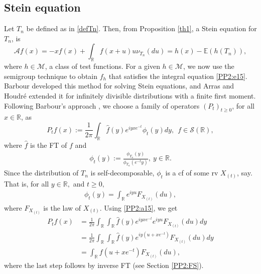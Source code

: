 \documentclass[12pt, a4paper,reqno]{amsart}
\theoremstyle{definition}
\theoremstyle{myremark}
\numberwithin{equation}{section}
\begin{document}
\subsection{Stein equation}\label{SEBGD}
Let $T_n$ be defined as in \eqref{defTn}. Then, from Proposition \ref{th1}, a Stein equation for $T_n$, is
\begin{equation}\label{PP2:e15}
\mathcal{A}f(x)=-xf(x)+\displaystyle\int_{\mathbb{R}}f(x+u)u\nu_{T_n}(du)= h(x)-\mathbb{E}(h(T_n)),
\end{equation}
\noindent
where $h\in \mathcal{M}$, a class of test functions. For a given $h\in \mathcal{M}$, we now use the semigroup technique to obtain $f_h$ that satisfies the integral equation \eqref{PP2:e15}. Barbour \cite{k8} developed this method for solving Stein equations, and Arras and Houdr\'e \cite{k0} extended it for infinitely divisible distributions with a finite first moment. Following Barbour's approach \cite{k8}, we choose a family of operators $(P_{t})_{t\geq0}$, for all $x\in\mathbb{R}$, as
\begin{equation}\label{PP2:e16}
P_{t}f(x):=\frac{1}{2\pi}\int_{\mathbb{R}}\widehat{f}(y)e^{iyxe^{-t} }\phi_t(y)dy, ~~f\in\mathcal{S}(\mathbb{{R}}),
\end{equation}
\noindent 
where $\hat{f}$ is the FT of $f$ and
\begin{align}\label{nPP2:a15}
\phi_t(y):=\frac{\phi_{T_n}(y)}{\phi_{T_n}(e^{-t}y)},~y\in \mathbb{{R}}.
\end{align}
\noindent
Since the distribution of $T_n$ is self-decomposable,  $\phi_{t}$ is a cf \cite[p.90]{sato} of some rv $X_{(t)}$, say. That is, for all $y\in \mathbb{R},$ and $t\geq 0,$
\begin{align}\label{PP2:a15}
\phi_t(y)=\displaystyle\int_{\mathbb{R}}e^{iy u}F_{X_{(t)}}(du),
\end{align}
\noindent
where $F_{X_{(t)}}$ is the law of $X_{(t)}$. Using \eqref{PP2:a15}, we get
\begin{align}
\nonumber  P_tf(x)&=\frac{1}{2\pi}\int_{\mathbb R}\int_{\mathbb{R}}\widehat{f}(y)e^{iy xe^{-t}}e^{iy u}F_{X_{(t)}}(du)dy\\
\nonumber  &=\frac{1}{2\pi}\int_{\mathbb R}\int_{\mathbb{R}}\widehat{f}(y)e^{iy (u+xe^{-t})}F_{X_{(t)}}(du)dy\\
&=\displaystyle\int_{\mathbb{R}}f(u+xe^{-t})F_{X_{(t)}}(du),\label{PP2:a17}
\end{align}
\noindent
where the last step follows by inverse FT (see Section \ref{PP2:FS}).
\end{document}
